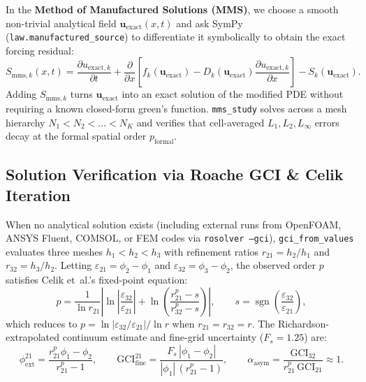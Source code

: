 \documentclass[11pt,a4paper]{article}
\newcommand{\pd}[2]{\frac{\partial #1}{\partial #2}}
\begin{document}
In the \textbf{Method of Manufactured Solutions (MMS)}, we choose a smooth non-trivial analytical field $\mathbf{u}_{\text{exact}}(x,t)$ and ask SymPy (\texttt{law.manufactured\_source}) to differentiate it symbolically to obtain the exact forcing residual:
\begin{equation}
  S_{\text{mms},k}(x,t) = \pd{u_{\text{exact},k}}{t} + \pd{}{x}\!\left[f_k(\mathbf{u}_{\text{exact}}) - D_k(\mathbf{u}_{\text{exact}})\pd{u_{\text{exact},k}}{x}\right] - S_k(\mathbf{u}_{\text{exact}}).
\end{equation}
Adding $S_{\text{mms},k}$ turns $\mathbf{u}_{\text{exact}}$ into an exact solution of the modified PDE without requiring a known closed-form green's function. \texttt{mms\_study} solves across a mesh hierarchy $N_1 < N_2 < \dots < N_K$ and verifies that cell-averaged $L_1, L_2, L_\infty$ errors decay at the formal spatial order $p_{\text{formal}}$.

\subsection{Solution Verification via Roache GCI \& Celik Iteration}
When no analytical solution exists (including external runs from OpenFOAM, ANSYS Fluent, COMSOL, or FEM codes via \texttt{rosolver --gci}), \texttt{gci\_from\_values} evaluates three meshes $h_1 < h_2 < h_3$ with refinement ratios $r_{21} = h_2/h_1$ and $r_{32} = h_3/h_2$. Letting $\varepsilon_{21} = \phi_2 - \phi_1$ and $\varepsilon_{32} = \phi_3 - \phi_2$, the observed order $p$ satisfies Celik et~al.'s fixed-point equation:
\begin{equation}
  p = \frac{1}{\ln r_{21}}\left|\ln\!\left|\frac{\varepsilon_{32}}{\varepsilon_{21}}\right| + \ln\!\left(\frac{r_{21}^p - s}{r_{32}^p - s}\right)\right|,
  \qquad s = \operatorname{sgn}\!\left(\frac{\varepsilon_{32}}{\varepsilon_{21}}\right),
\end{equation}
which reduces to $p = \ln|\varepsilon_{32}/\varepsilon_{21}| / \ln r$ when $r_{21} = r_{32} = r$. The Richardson-extrapolated continuum estimate and fine-grid uncertainty ($F_s = 1.25$) are:
\begin{equation}
  \phi_{\text{ext}}^{21} = \frac{r_{21}^p \phi_1 - \phi_2}{r_{21}^p - 1},
  \qquad
  \mathrm{GCI}_{\text{fine}}^{21} = \frac{F_s\,|\phi_1 - \phi_2|}{|\phi_1|\,(r_{21}^p - 1)},
  \qquad
  \alpha_{\text{asym}} = \frac{\mathrm{GCI}_{32}}{r_{21}^p\,\mathrm{GCI}_{21}} \approx 1.
\end{equation}
\end{document}
